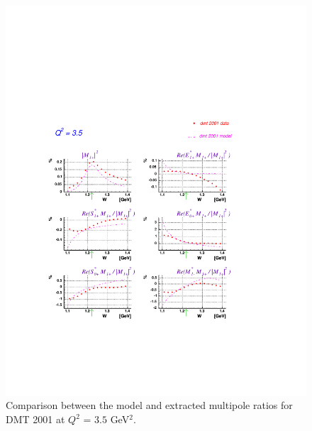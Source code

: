 \begin{figure}[h]
 \begin{center}
 \includegraphics[width = 15cm, bb=60 100 540 600]{analysis/img/multipoles_q2_3.5_data2}
  \caption[Comparison between the model (dashed blue line) and extracted (red points) multipole ratios for DMT 2001]
          { Comparison between the model and extracted multipole ratios for DMT 2001 at $Q^2$ = $3.5$ GeV$^2$. }
 \label{fig:dmt_comp}
\end{center}
\end{figure}

